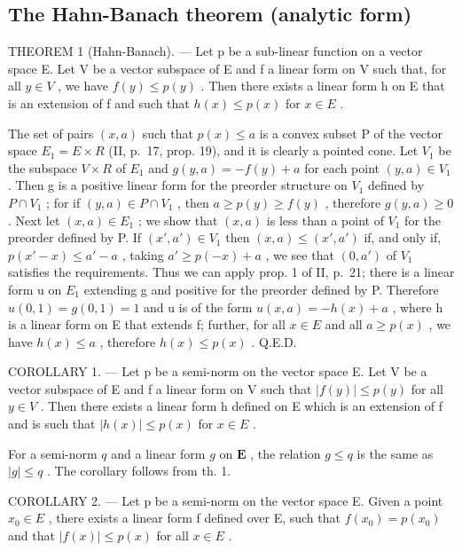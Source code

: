 \subsection{The Hahn-Banach theorem (analytic form)}

THEOREM 1 (Hahn-Banach). --- Let p be a sub-linear function on a vector space E. Let V be a vector subspace of E and f a linear form on V such that, for all \(y \in V\) , we have \(f(y) \leqslant p(y)\) . Then there exists a linear form h on E that is an extension of f and such that \(h(x) \leqslant p(x)\) for \(x \in E\) .

The set of pairs \((x, a)\) such that \(p(x) \leqslant a\) is a convex subset P of the vector space \(E_{1} = E \times R\) (II, p.~17, prop. 19), and it is clearly a pointed cone. Let \(V_{1}\) be the subspace \(V \times R\) of \(E_{1}\) and \(g(y, a) = -f(y) + a\) for each point \((y, a) \in V_{1}\) . Then g is a positive linear form for the preorder structure on \(V_{1}\) defined by \(P \cap V_{1}\) ; for if \((y, a) \in P \cap V_{1}\) , then \(a \geqslant p(y) \geqslant f(y)\) , therefore \(g(y, a) \geqslant 0\) . Next let \((x, a) \in E_{1}\) ; we show that \((x, a)\) is less than a point of \(V_{1}\) for the preorder defined by P. If \((x', a') \in V_{1}\) then \((x, a) \leqslant (x', a')\) if, and only if, \(p(x' - x) \leqslant a' - a\) , taking \(a' \geqslant p(-x) + a\) , we see that \((0, a')\) of \(V_{1}\) satisfies the requirements. Thus we can apply prop. 1 of II, p.~21; there is a linear form u on \(E_{1}\) extending g and positive for the preorder defined by P. Therefore \(u(0, 1) = g(0, 1) = 1\) and u is of the form \(u(x, a) = -h(x) + a\) , where h is a linear form on E that extends f; further, for all \(x \in E\) and all \(a \geqslant p(x)\) , we have \(h(x) \leqslant a\) , therefore \(h(x) \leqslant p(x)\) . Q.E.D.

COROLLARY 1. --- Let p be a semi-norm on the vector space E. Let V be a vector subspace of E and f a linear form on V such that \(|f(y)| \leqslant p(y)\) for all \(y \in V\) . Then there exists a linear form h defined on E which is an extension of f and is such that \(|h(x)| \leqslant p(x)\) for \(x \in E\) .

For a semi-norm \(q\) and a linear form \(g\) on \(\mathbf{E}\) , the relation \(g \leqslant q\) is the same as \(|g| \leqslant q\) . The corollary follows from th. 1.

COROLLARY 2. --- Let p be a semi-norm on the vector space E. Given a point \(x_{0} \in E\) , there exists a linear form f defined over E, such that \(f(x_{0}) = p(x_{0})\) and that \(|f(x)| \leqslant p(x)\) for all \(x \in E\) .

